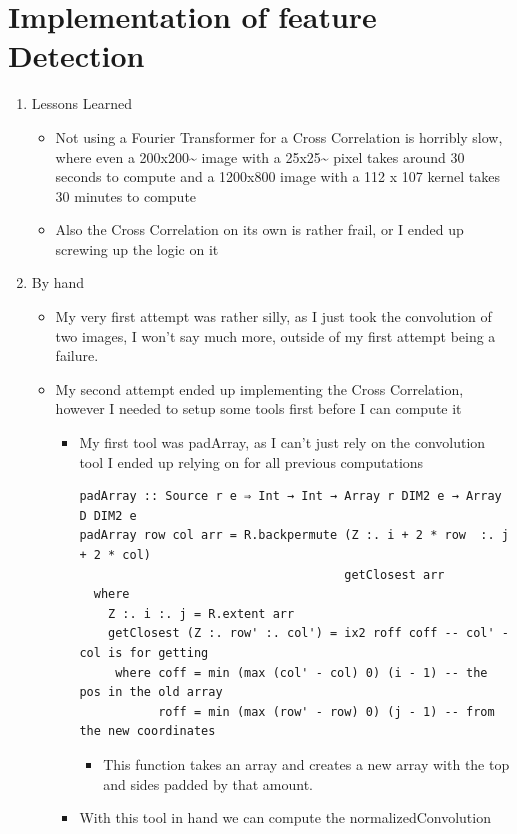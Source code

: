 \documentclass{article}
\begin{document}
\section{Implementation of feature Detection}
\label{sec-2}
\begin{enumerate}
\item Lessons Learned
\label{sec-2-1}
\begin{itemize}
\item Not using a Fourier Transformer for a Cross Correlation is horribly
slow, where even a 200x200\textasciitilde{} image with a 25x25\textasciitilde{} pixel takes around
30 seconds to compute and a 1200x800 image with a 112 x 107 kernel
takes 30 minutes to compute
\item Also the Cross Correlation on its own is rather frail, or I ended up
screwing up the logic on it
\end{itemize}
\item By hand
\label{sec-2-2}
\begin{itemize}
\item My very first attempt was rather silly, as Ι just took the
convolution of two images, I won't say much more, outside of my
first attempt being a failure.
\item My second attempt ended up implementing the Cross Correlation,
however Ι needed to setup some tools first before Ι can compute it
\begin{itemize}
\item My first tool was padArray, as I can't just rely on the
convolution tool Ι ended up relying on for all previous computations
\begin{verbatim}
padArray :: Source r e ⇒ Int → Int → Array r DIM2 e → Array D DIM2 e
padArray row col arr = R.backpermute (Z :. i + 2 * row  :. j + 2 * col)
                                     getClosest arr
  where
    Z :. i :. j = R.extent arr
    getClosest (Z :. row' :. col') = ix2 roff coff -- col' - col is for getting
     where coff = min (max (col' - col) 0) (i - 1) -- the pos in the old array
           roff = min (max (row' - row) 0) (j - 1) -- from the new coordinates
\end{verbatim}
\begin{itemize}
\item This function takes an array and creates a new array with the top
and sides padded by that amount.
\end{itemize}
\item With this tool in hand we can compute the normalizedConvolution
\begin{verbatim}

\end{verbatim}
\end{itemize}
\end{itemize}
\end{enumerate}
\end{document}
